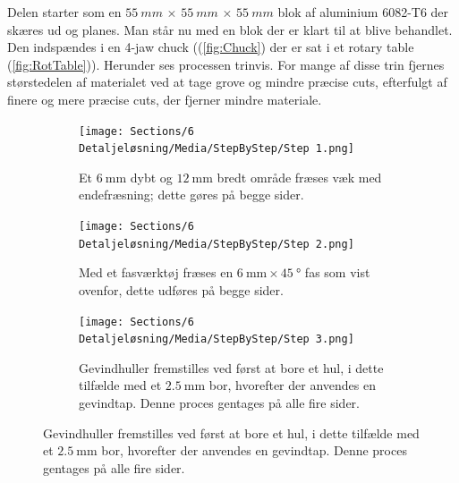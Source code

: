 Delen starter som en \(\SI{55}{mm}\) \(\times\) \(\SI{55}{mm}\) \(\times\) \(\SI{55}{mm}\) blok af aluminium 6082-T6 der skæres ud og planes. Man står nu med en blok der er klart til at blive behandlet. Den indspændes i en 4-jaw chuck ((\ref{fig:Chuck}) der er sat i et rotary table (\ref{fig:RotTable})). Herunder ses processen trinvis. For mange af disse trin fjernes størstedelen af materialet ved at tage grove og mindre præcise cuts, efterfulgt af finere og mere præcise cuts, der fjerner mindre materiale.



\begin{figure}[H]
    \centering
        \begin{subfigure}[t]{0.32\textwidth}
            \centering
            \texttt{[image: Sections/6 Detaljeløsning/Media/StepByStep/Step 1.png]}
            \caption{Et $\SI{6}{\milli\meter}$ dybt og $\SI{12}{\milli\meter}$ bredt område fræses væk med endefræsning; dette gøres på begge sider.}
            \label{fig:Step1}
        \end{subfigure}
        \hfill
        \begin{subfigure}[t]{0.32\textwidth}
            \centering
            \texttt{[image: Sections/6 Detaljeløsning/Media/StepByStep/Step 2.png]}
            \caption{Med et fasværktøj fræses en $\SI{6}{\mm} \times \SI{45}{\degree}$ fas som vist ovenfor, dette udføres på begge sider.}
            \label{fig:Step2}
        \end{subfigure}
        \hfill
        \begin{subfigure}[t]{0.33\textwidth}
            \centering
            \texttt{[image: Sections/6 Detaljeløsning/Media/StepByStep/Step 3.png]}
            \caption{Gevindhuller fremstilles ved først at bore et hul, i dette tilfælde med et $\SI{2.5}{\milli\meter}$ bor, hvorefter der anvendes en gevindtap. Denne proces gentages på alle fire sider.}
            \label{fig:Step3}
        \end{subfigure}
    
    \vspace{1em}
    

\end{figure}

